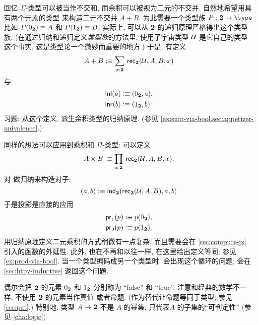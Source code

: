 回忆 $\Sigma$-类型可以被当作不交和, 而余积可以被视为二元的不交并.
自然地希望用具有两个元素的类型 \bool 来构造二元不交并 $A+B$.
为此需要一个类型族 $P:\bool\to\type$ 比如 $P({0_{\mathbf{2}}})\equiv A$ 和 $P({1_{\mathbf{2}}})\equiv B$.
实际上, 可以从 $\mathbf{2}$ 的递归原理严格得出这个类型族.
%
(在通过归纳和递归定义\emph{类型族}的方法里, 使用了宇宙类型 $\mathcal{U}$ 是它自己的类型这个事实, 这是类型论一个微妙而重要的地方.)
于是, 有定义
%
\[ A + B \defeq \sm{x:\bool} \rec{\bool}(\UU,A,B,x) \]
与
\begin{align*}
    {\mathsf{inl}}(a) &\vcentcolon\equiv ({0_{\mathbf{2}}},a), \\
    {\mathsf{inr}}(b) &\vcentcolon\equiv ({1_{\mathbf{2}}},b).
\end{align*}
习题: 从这个定义, 派生余积类型的归纳原理.
(参见 \cref{ex:sum-via-bool,sec:appetizer-univalence}.)

同样的想法可以应用到乘积和 $\Pi$-类型: 可以定义
\[ A \times B \defeq \prd{x:\bool}\rec{\bool}(\UU,A,B,x). \]
对 \bool 做归纳来构造对子:
\[ (a,b) \vcentcolon\equiv \mathsf{ind}_{\mathbf{2}}(\mathsf{rec}_{\mathbf{2}}(\mathcal{U},A,B),a,b) \]
于是投影是直接的应用
\begin{align*}
    \mathsf{pr}_{1}(p) &\vcentcolon\equiv p({0_{\mathbf{2}}}), \\
    \mathsf{pr}_{2}(p) &\vcentcolon\equiv p({1_{\mathbf{2}}}).
\end{align*}
用归纳原理定义二元乘积的方式稍微有一点复杂, 而且需要会在 \cref{sec:compute-pi} 引入的函数的外延性.
此外, 也在不再和以往一样, 在这里给出定义等同;
参见 \cref{ex:prod-via-bool}.
当一个类型编码成另一个类型时, 会出现这个循环的问题;
会在 \cref{sec:htpy-inductive} 返回这个问题.

偶尔会把 $\mathbf{2}$ 的元素 ${0_{\mathbf{2}}}$ 和 ${1_{\mathbf{2}}}$ 分别称为 ``false'' 和 ``true''.
注意和经典的数学不一样, 不使用 $\mathbf{2}$ 的元素当作真值%
%
或者命题.
(作为替代让命题等同于类型;
参见 \cref{sec:pat}.)
特别地, 类型 $A \to \mathbf{2}$ 不是 $A$ 的幂集; 只代表$A$ 的子集的``可判定性'' (参见 \cref{cha:logic}).
%

%